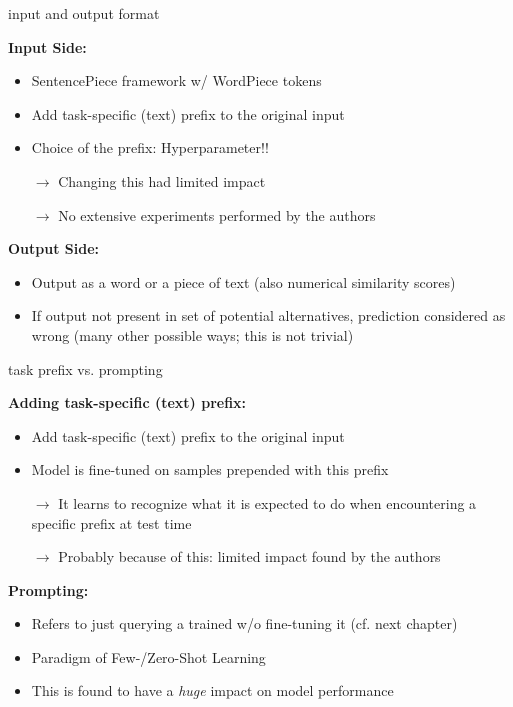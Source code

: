 \begin{frame}{input and output format}

\vfill

	\textbf{Input Side:}

	\begin{itemize}
		\item SentencePiece framework w/ WordPiece tokens
		\item Add task-specific (text) prefix to the original input
		\item Choice of the prefix: Hyperparameter!! 
		\item[$\to$] Changing this had limited impact
		\item[$\to$] No extensive experiments performed by the authors
	\end{itemize}
	
	\vspace{.5cm}

	\textbf{Output Side:}

	\begin{itemize}
		\item Output as a word or a piece of text (also numerical similarity scores)
		\item If output not present in set of potential alternatives, prediction considered as wrong (many other possible ways; this is not trivial)
	\end{itemize}
	
\vfill

\end{frame}


\begin{frame}{task prefix vs. prompting}

\vfill

	\textbf{Adding task-specific (text) prefix:}

	\begin{itemize}
		\item Add task-specific (text) prefix to the original input
		\item Model is fine-tuned on samples prepended with this prefix
		\item[$\to$] It learns to recognize what it is expected to do when encountering a specific prefix at test time
		\item[$\to$] Probably because of this: limited impact found by the authors
	\end{itemize}
	
	\vspace{.5cm}

	\textbf{Prompting:}

	\begin{itemize}
		\item Refers to just querying a trained w/o fine-tuning it (cf. next chapter)
		\item Paradigm of Few-/Zero-Shot Learning
		\item This is found to have a \textit{huge} impact on model performance
	\end{itemize}
	
\vfill

\end{frame}

